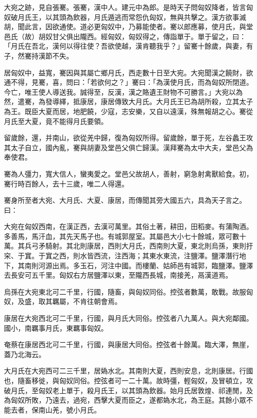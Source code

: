 
\begin{pinyinscope}
大宛之跡，見自張騫。張騫，漢中人。建元中為郎。是時天子問匈奴降者，皆言匈奴破月氏王，以其頭為飲器，月氏遁逃而常怨仇匈奴，無與共擊之。漢方欲事滅胡，聞此言，因欲通使。道必更匈奴中，乃募能使者。騫以郎應募，使月氏，與堂邑氏（故）胡奴甘父俱出隴西。經匈奴，匈奴得之，傳詣單于。單于留之，曰：「月氏在吾北，漢何以得往使？吾欲使越，漢肯聽我乎？」留騫十餘歲，與妻，有子，然騫持漢節不失。

居匈奴中，益寬，騫因與其屬亡鄉月氏，西走數十日至大宛。大宛聞漢之饒財，欲通不得，見騫，喜，問曰：「若欲何之？」騫曰：「為漢使月氏，而為匈奴所閉道。今亡，唯王使人導送我。誠得至，反漢，漢之賂遺王財物不可勝言。」大宛以為然，遣騫，為發導繹，抵康居，康居傳致大月氏。大月氏王已為胡所殺，立其太子為王。既臣大夏而居，地肥饒，少寇，志安樂，又自以遠漢，殊無報胡之心。騫從月氏至大夏，竟不能得月氏要領。

留歲餘，還，并南山，欲從羌中歸，復為匈奴所得。留歲餘，單于死，左谷蠡王攻其太子自立，國內亂，騫與胡妻及堂邑父俱亡歸漢。漢拜騫為太中大夫，堂邑父為奉使君。

騫為人彊力，寬大信人，蠻夷愛之。堂邑父故胡人，善射，窮急射禽獸給食。初，騫行時百餘人，去十三歲，唯二人得還。

騫身所至者大宛、大月氏、大夏、康居，而傳聞其旁大國五六，具為天子言之。曰：

大宛在匈奴西南，在漢正西，去漢可萬里。其俗土著，耕田，田稻麥。有蒲陶酒。多善馬，馬汗血，其先天馬子也。有城郭屋室。其屬邑大小七十餘城，眾可數十萬。其兵弓矛騎射。其北則康居，西則大月氏，西南則大夏，東北則烏孫，東則扜穼、于窴。于窴之西，則水皆西流，注西海；其東水東流，注鹽澤。鹽澤潛行地下，其南則河源出焉。多玉石，河注中國。而樓蘭、姑師邑有城郭，臨鹽澤。鹽澤去長安可五千里。匈奴右方居鹽澤以東，至隴西長城，南接羌，鬲漢道焉。

烏孫在大宛東北可二千里，行國，隨畜，與匈奴同俗。控弦者數萬，敢戰。故服匈奴，及盛，取其羈屬，不肯往朝會焉。

康居在大宛西北可二千里，行國，與月氏大同俗。控弦者八九萬人。與大宛鄰國。國小，南羈事月氏，東羈事匈奴。

奄蔡在康居西北可二千里，行國，與康居大同俗。控弦者十餘萬。臨大澤，無崖，蓋乃北海云。

大月氏在大宛西可二三千里，居媯水北。其南則大夏，西則安息，北則康居。行國也，隨畜移徙，與匈奴同俗。控弦者可一二十萬。故時彊，輕匈奴，及冒頓立，攻破月氏，至匈奴老上單于，殺月氏王，以其頭為飲器。始月氏居敦煌、祁連閒，及為匈奴所敗，乃遠去，過宛，西擊大夏而臣之，遂都媯水北，為王庭。其餘小眾不能去者，保南山羌，號小月氏。


\end{pinyinscope}
